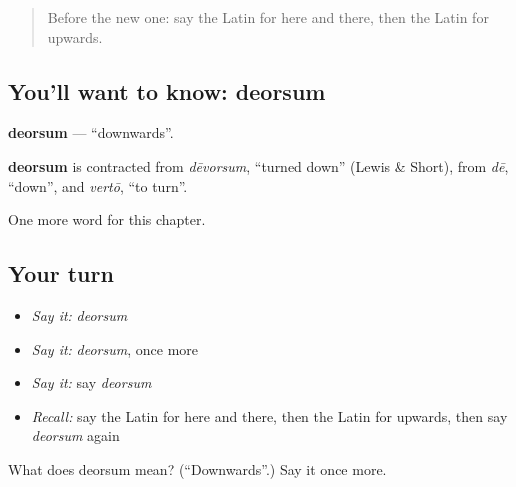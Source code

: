 \begin{quote}
Before the new one: say the Latin for here and there, then the Latin for upwards.
\end{quote}

\subsection*{You'll want to know: deorsum}
\textbf{deorsum} — \textquotedblleft{}downwards\textquotedblright{}.

\begin{cousinweb}
\textbf{deorsum} is contracted from \emph{dēvorsum}, \textquotedblleft{}turned down\textquotedblright{} (Lewis \& Short), from \emph{dē}, \textquotedblleft{}down\textquotedblright{}, and \emph{vertō}, \textquotedblleft{}to turn\textquotedblright{}.
\end{cousinweb}

\begin{grammarlens}[title={What you've built}]
One more word for this chapter.
\end{grammarlens}

\subsection*{Your turn}
\begin{itemize}
\raggedright
  \item \emph{Say it:} \emph{deorsum}
  \item \emph{Say it:} \emph{deorsum}, once more
  \item \emph{Say it:} say \emph{deorsum}
  \item \emph{Recall:} say the Latin for here and there, then the Latin for upwards, then say \emph{deorsum} again
\end{itemize}

\begin{tcolorbox}[breakable,colback=teal!4,colframe=teal!35!black,title={Before you move on}]
What does deorsum mean? (\textquotedblleft{}Downwards\textquotedblright{}.) Say it once more.
\end{tcolorbox}
